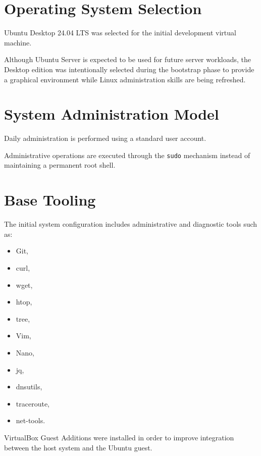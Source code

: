 \section{Operating System Selection}

Ubuntu Desktop 24.04 LTS was selected for the initial development virtual
machine.

Although Ubuntu Server is expected to be used for future server workloads,
the Desktop edition was intentionally selected during the bootstrap phase
to provide a graphical environment while Linux administration skills
are being refreshed.

\section{System Administration Model}

Daily administration is performed using a standard user account.

Administrative operations are executed through the \texttt{sudo} mechanism
instead of maintaining a permanent root shell.

\section{Base Tooling}

The initial system configuration includes administrative and diagnostic
tools such as:

\begin{itemize}
    \item Git,
    \item curl,
    \item wget,
    \item htop,
    \item tree,
    \item Vim,
    \item Nano,
    \item jq,
    \item dnsutils,
    \item traceroute,
    \item net-tools.
\end{itemize}

VirtualBox Guest Additions were installed in order to improve integration
between the host system and the Ubuntu guest.